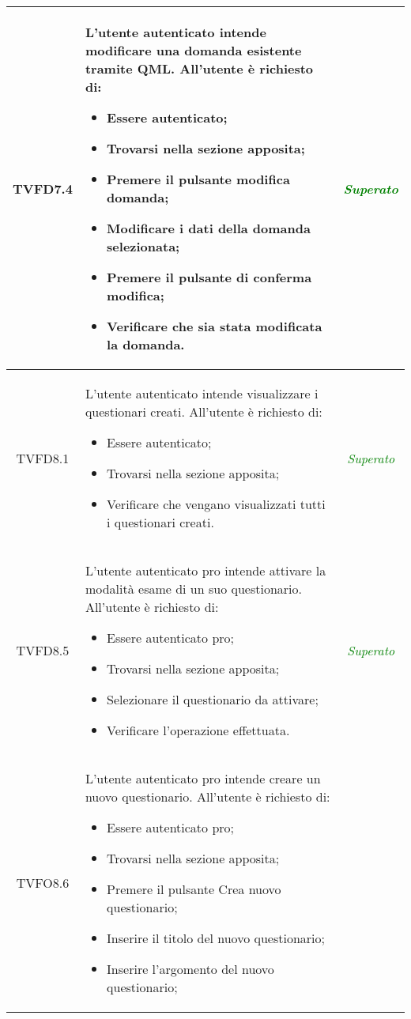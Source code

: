 \begin{longtable}[ht]{|c|>{}m{8cm}|c|}
\hypertarget{TVFD7.4}{TVFD7.4} & L’utente autenticato intende modificare una
domanda esistente tramite QML. All’utente è richiesto di:
\begin{itemize}
\item Essere autenticato;
\item Trovarsi nella sezione apposita;
\item Premere il pulsante  modifica domanda;
\item Modificare i dati della domanda selezionata;
\item Premere il pulsante di conferma modifica;
\item Verificare che sia stata modificata la domanda.
\end{itemize} & \textcolor{Green}{\textit{Superato}}\\ \hline
\hypertarget{TVFD8.1}{TVFD8.1} & L’utente autenticato intende visualizzare i questionari creati. All’utente è richiesto di:
\begin{itemize}
\item Essere autenticato;
\item Trovarsi nella sezione apposita;
\item Verificare che vengano visualizzati tutti i questionari creati.
\end{itemize} & \textcolor{Green}{\textit{Superato}}\\ \hline
\hypertarget{TVFD8.5}{TVFD8.5} & L’utente autenticato pro  intende attivare la modalità esame di un suo questionario. All’utente è richiesto di:
\begin{itemize}
\item Essere autenticato pro;
\item Trovarsi nella sezione apposita;
\item Selezionare il questionario da attivare;
\item Verificare l'operazione effettuata.
\end{itemize} & \textcolor{Green}{\textit{Superato}}\\ \hline
\hypertarget{TVFO8.6}{TVFO8.6} & L’utente autenticato pro  intende creare  un nuovo questionario. All’utente è richiesto di:
\begin{itemize}
\item Essere autenticato pro;
\item Trovarsi nella sezione apposita;
\item Premere il pulsante Crea nuovo questionario;
\item Inserire il titolo del nuovo questionario;
\item Inserire l’argomento del nuovo questionario;

\end{itemize}
\end{longtable}
